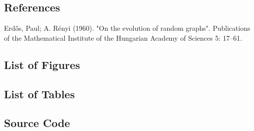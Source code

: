 \documentclass[11pt]{article}
\begin{document}
\subsection{References}

Erdős, Paul; A. Rényi (1960). "On the evolution of random graphs". Publications of the Mathematical Institute of the Hungarian Academy of Sciences 5: 17–61.

\subsection{List of Figures}

\subsection{List of Tables}

\subsection{Source Code}
\end{document}
